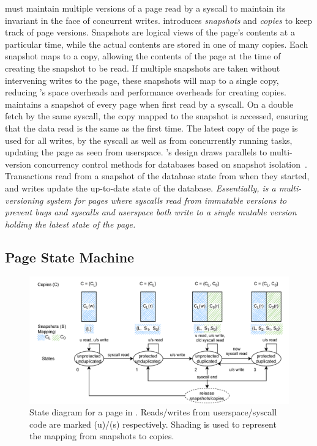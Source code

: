 \documentclass[letterpaper,twocolumn,10pt]{article}
\begin{document}
\tiktok must maintain multiple versions of a page read by a syscall 
to maintain its invariant in the face of concurrent writes.
\tiktok introduces \emph{snapshots} and \emph{copies} to keep track 
of page versions. 
Snapshots are logical views of the page's contents at a particular time,
while the actual contents are stored in one of many copies. 
Each snapshot maps to a copy, allowing the contents of the page at the 
time of creating the snapshot to be read. 
If multiple snapshots are taken without intervening writes to the page, 
these snapshots will map to a single copy, reducing \tiktok's space overheads 
and performance overheads for creating copies.
\tiktok maintains a snapshot of every page when first read by a syscall.
On a double fetch by the same syscall, the copy mapped to the snapshot 
is accessed, ensuring that the data read is the same as the first time.
The latest copy of the page is used for all writes, by the syscall as 
well as from concurrently running tasks, updating the page as seen 
from userspace.
%
\tiktok's design draws parallels to multi-version concurrency control 
methods for databases based on snapshot isolation~\cite{0001MK15}.
Transactions read from a snapshot of the database state from when 
they started, and writes update the up-to-date state of the database.
%
\emph{Essentially, \tiktok is a multi-versioning system for pages where 
syscalls read from immutable versions to prevent \tocttou bugs and
syscalls and userspace both write to a single mutable version 
holding the latest state of the page.}

\subsection{Page State Machine}

\begin{figure}[]
  \centering
  \includegraphics[width=0.9\linewidth]{img/tiktok_states.pdf}
  \caption{State diagram for a page in \tiktok. Reads/writes from userspace/syscall 
          code are marked (u)/(s) respectively. Shading is used to represent the 
          mapping from snapshots to copies.}
  \label{fig:tiktok_states}
\end{figure}
\end{document}
